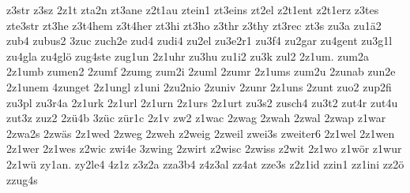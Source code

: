 {z3str
z3sz
2z1t
zta2n
zt3ane
z2t1au
ztein1
zt3eins
zt2el
z2t1ent
z2t1erz
z3tes
zte3str
zt3he
z3t4hem
z3t4her
zt3hi
zt3ho
z3thr
z3thy
zt3rec
zt3s
zu3a
zu1ä2
zub4
zubus2
3zuc
zuch2e
zud4
zudi4
zu2el
zu3e2r1
zu3f4
zu2gar
zu4gent
zu3g1l
zu4gla
zu4glö
zug4ste
zug1un
2z1uhr
zu3hu
zu1i2
zu3k
zul2
2z1um.
zum2a
2z1umb
zumen2
2zumf
2zumg
zum2i
2zuml
2zumr
2z1ums
zum2u
2zunab
zun2e
2z1unem
4zunget
2z1ungl
z1uni
2zu2nio
2zuniv
2zunr
2z1uns
2zunt
zuo2
zup2fi
zu3pl
zu3r4a
2z1urk
2z1url
2z1urn
2z1urs
2z1urt
zu3s2
zusch4
zu3t2
zut4r
zut4u
zut3z
zuz2
2zü4b
3züc
zür1c
2z1v
zw2
z1wac
2zwag
2zwah
2zwal
2zwap
z1war
2zwa2s
2zwäs
2z1wed
2zweg
2zweh
z2weig
2zweil
zwei3s
zweiter6
2z1wel
2z1wen
2z1wer
2z1wes
z2wic
zwi4e
3zwing
2zwirt
z2wisc
2zwiss
z2wit
2z1wo
z1wör
z1wur
2z1wü
zy1an.
zy2le4
4z1z
z3z2a
zza3b4
z4z3al
zz4at
zze3s
z2z1id
zzin1
zz1ini
zz2ö
zzug4s
}

\endinput

